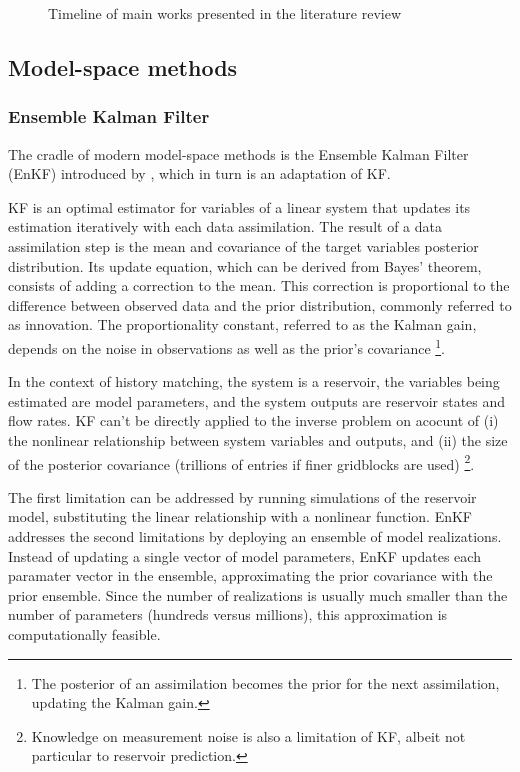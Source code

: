 \begin{figure}[htbp]
    \centering
    \caption{Timeline of main works presented in the literature review}
    \label{fig:timeline-literature}
    \scalebox{1.0}{%
        
    }
\end{figure}

\subsection{Model-space methods}
\label{subsec:model-space-methods}

\subsubsection{Ensemble Kalman Filter}

The cradle of modern model-space methods is the Ensemble Kalman Filter (EnKF)
introduced by , which in turn is an adaptation of KF.

KF is an optimal estimator for variables of a linear system \cite[section 4.1]{Emerick:2025}
that updates its estimation iteratively with each data assimilation.
%
The result of a data assimilation step is the mean and covariance of the target variables posterior distribution.
%
Its update equation, which can be derived from Bayes' theorem, 
consists of adding a correction to the mean.
%
This correction is proportional to the difference
between observed data and the prior distribution, commonly referred to as innovation.
%
The proportionality constant, referred to as the Kalman gain, 
depends on the noise in observations as well as the prior's covariance%
\footnote{%
    The posterior of an assimilation becomes the prior for the next assimilation,
    updating the Kalman gain.
}.

In the context of history matching, 
the system is a reservoir, 
the variables being estimated are model parameters,
and the system outputs are reservoir states and flow rates.
%
KF can't be directly applied to the inverse problem on acocunt of 
(i) the nonlinear relationship between system variables and outputs, and 
(ii) the size of the posterior covariance (trillions of entries if finer gridblocks are used)%
\footnote{%
    Knowledge on measurement noise is also a limitation of KF, albeit not particular to reservoir prediction.
}.

The first limitation can be addressed by running simulations of the reservoir model, 
substituting the linear relationship with a nonlinear function.
EnKF addresses the second limitations by deploying an ensemble of model realizations. 
%
Instead of updating a single vector of model parameters, 
EnKF updates each paramater vector in the ensemble, approximating the prior covariance with the prior ensemble. 
%
Since the number of realizations is usually much smaller than the number of parameters (hundreds versus millions),
this approximation is computationally feasible.

